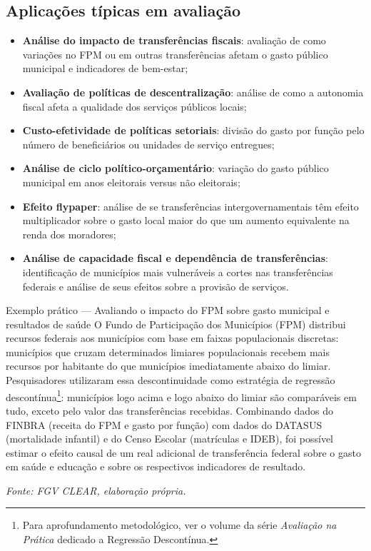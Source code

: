 \subsection{Aplicações típicas em avaliação}

\begin{itemize}
  \item \textbf{Análise do impacto de transferências fiscais}: avaliação de como variações no FPM ou em outras transferências afetam o gasto público municipal e indicadores de bem-estar;
  \item \textbf{Avaliação de políticas de descentralização}: análise de como a autonomia fiscal afeta a qualidade dos serviços públicos locais;
  \item \textbf{Custo-efetividade de políticas setoriais}: divisão do gasto por função pelo número de beneficiários ou unidades de serviço entregues;
  \item \textbf{Análise de ciclo político-orçamentário}: variação do gasto público municipal em anos eleitorais versus não eleitorais;
  \item \textbf{Efeito flypaper}: análise de se transferências intergovernamentais têm efeito multiplicador sobre o gasto local maior do que um aumento equivalente na renda dos moradores;
  \item \textbf{Análise de capacidade fiscal e dependência de transferências}: identificação de municípios mais vulneráveis a cortes nas transferências federais e análise de seus efeitos sobre a provisão de serviços.
\end{itemize}

\begin{boxexemplo}{Exemplo prático --- Avaliando o impacto do FPM sobre gasto municipal e resultados de saúde}
O Fundo de Participação dos Municípios (FPM) distribui recursos federais aos municípios com base em faixas populacionais discretas: municípios que cruzam determinados limiares populacionais recebem mais recursos por habitante do que municípios imediatamente abaixo do limiar. Pesquisadores utilizaram essa descontinuidade como estratégia de regressão descontínua\footnote{Para aprofundamento metodológico, ver o volume da série \textit{Avaliação na Prática} dedicado a Regressão Descontínua.}: municípios logo acima e logo abaixo do limiar são comparáveis em tudo, exceto pelo valor das transferências recebidas. Combinando dados do FINBRA (receita do FPM e gasto por função) com dados do DATASUS (mortalidade infantil) e do Censo Escolar (matrículas e IDEB), foi possível estimar o efeito causal de um real adicional de transferência federal sobre o gasto em saúde e educação e sobre os respectivos indicadores de resultado.

\textit{Fonte: FGV CLEAR, elaboração própria.}
\end{boxexemplo}

